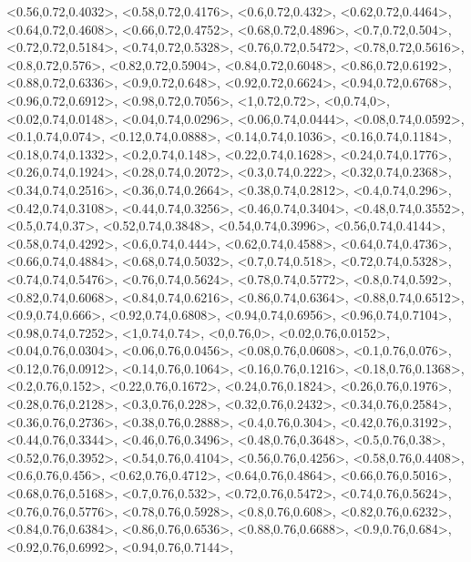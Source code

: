 \documentclass[a4paper,10pt]{article}
\begin{document}
\begin{eulernotebook}
\begin{euleroutput}
  <0.56,0.72,0.4032>,
  <0.58,0.72,0.4176>,
  <0.6,0.72,0.432>,
  <0.62,0.72,0.4464>,
  <0.64,0.72,0.4608>,
  <0.66,0.72,0.4752>,
  <0.68,0.72,0.4896>,
  <0.7,0.72,0.504>,
  <0.72,0.72,0.5184>,
  <0.74,0.72,0.5328>,
  <0.76,0.72,0.5472>,
  <0.78,0.72,0.5616>,
  <0.8,0.72,0.576>,
  <0.82,0.72,0.5904>,
  <0.84,0.72,0.6048>,
  <0.86,0.72,0.6192>,
  <0.88,0.72,0.6336>,
  <0.9,0.72,0.648>,
  <0.92,0.72,0.6624>,
  <0.94,0.72,0.6768>,
  <0.96,0.72,0.6912>,
  <0.98,0.72,0.7056>,
  <1,0.72,0.72>,
  <0,0.74,0>,
  <0.02,0.74,0.0148>,
  <0.04,0.74,0.0296>,
  <0.06,0.74,0.0444>,
  <0.08,0.74,0.0592>,
  <0.1,0.74,0.074>,
  <0.12,0.74,0.0888>,
  <0.14,0.74,0.1036>,
  <0.16,0.74,0.1184>,
  <0.18,0.74,0.1332>,
  <0.2,0.74,0.148>,
  <0.22,0.74,0.1628>,
  <0.24,0.74,0.1776>,
  <0.26,0.74,0.1924>,
  <0.28,0.74,0.2072>,
  <0.3,0.74,0.222>,
  <0.32,0.74,0.2368>,
  <0.34,0.74,0.2516>,
  <0.36,0.74,0.2664>,
  <0.38,0.74,0.2812>,
  <0.4,0.74,0.296>,
  <0.42,0.74,0.3108>,
  <0.44,0.74,0.3256>,
  <0.46,0.74,0.3404>,
  <0.48,0.74,0.3552>,
  <0.5,0.74,0.37>,
  <0.52,0.74,0.3848>,
  <0.54,0.74,0.3996>,
  <0.56,0.74,0.4144>,
  <0.58,0.74,0.4292>,
  <0.6,0.74,0.444>,
  <0.62,0.74,0.4588>,
  <0.64,0.74,0.4736>,
  <0.66,0.74,0.4884>,
  <0.68,0.74,0.5032>,
  <0.7,0.74,0.518>,
  <0.72,0.74,0.5328>,
  <0.74,0.74,0.5476>,
  <0.76,0.74,0.5624>,
  <0.78,0.74,0.5772>,
  <0.8,0.74,0.592>,
  <0.82,0.74,0.6068>,
  <0.84,0.74,0.6216>,
  <0.86,0.74,0.6364>,
  <0.88,0.74,0.6512>,
  <0.9,0.74,0.666>,
  <0.92,0.74,0.6808>,
  <0.94,0.74,0.6956>,
  <0.96,0.74,0.7104>,
  <0.98,0.74,0.7252>,
  <1,0.74,0.74>,
  <0,0.76,0>,
  <0.02,0.76,0.0152>,
  <0.04,0.76,0.0304>,
  <0.06,0.76,0.0456>,
  <0.08,0.76,0.0608>,
  <0.1,0.76,0.076>,
  <0.12,0.76,0.0912>,
  <0.14,0.76,0.1064>,
  <0.16,0.76,0.1216>,
  <0.18,0.76,0.1368>,
  <0.2,0.76,0.152>,
  <0.22,0.76,0.1672>,
  <0.24,0.76,0.1824>,
  <0.26,0.76,0.1976>,
  <0.28,0.76,0.2128>,
  <0.3,0.76,0.228>,
  <0.32,0.76,0.2432>,
  <0.34,0.76,0.2584>,
  <0.36,0.76,0.2736>,
  <0.38,0.76,0.2888>,
  <0.4,0.76,0.304>,
  <0.42,0.76,0.3192>,
  <0.44,0.76,0.3344>,
  <0.46,0.76,0.3496>,
  <0.48,0.76,0.3648>,
  <0.5,0.76,0.38>,
  <0.52,0.76,0.3952>,
  <0.54,0.76,0.4104>,
  <0.56,0.76,0.4256>,
  <0.58,0.76,0.4408>,
  <0.6,0.76,0.456>,
  <0.62,0.76,0.4712>,
  <0.64,0.76,0.4864>,
  <0.66,0.76,0.5016>,
  <0.68,0.76,0.5168>,
  <0.7,0.76,0.532>,
  <0.72,0.76,0.5472>,
  <0.74,0.76,0.5624>,
  <0.76,0.76,0.5776>,
  <0.78,0.76,0.5928>,
  <0.8,0.76,0.608>,
  <0.82,0.76,0.6232>,
  <0.84,0.76,0.6384>,
  <0.86,0.76,0.6536>,
  <0.88,0.76,0.6688>,
  <0.9,0.76,0.684>,
  <0.92,0.76,0.6992>,
  <0.94,0.76,0.7144>,

\end{euleroutput}
\end{eulernotebook}
\end{document}
